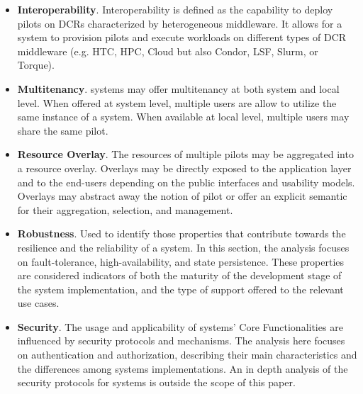 \documentclass{sig-alternate}
\begin{document}
\begin{itemize}
\item \textbf{Interoperability}. Interoperability is defined as the capability
  to deploy pilots on DCRs characterized by heterogeneous middleware. It allows
  for a \pilot system to provision pilots and execute workloads on different
  types of DCR middleware (e.g. HTC, HPC, Cloud but also Condor, LSF, Slurm, or
  Torque).

\item \textbf{Multitenancy}. \pilot systems may offer multitenancy at both
  system and local level. When offered at system level, multiple users are allow
  to utilize the same instance of a \pilot system. When available at local
  level, multiple users may share the same pilot.

\item \textbf{Resource Overlay}. The resources of multiple pilots may be
  aggregated into a resource overlay. Overlays may be directly exposed to the
  application layer and to the end-users depending on the public interfaces and
  usability models. Overlays may abstract away the notion of pilot or offer an
  explicit semantic for their aggregation, selection, and management.

\item \textbf{Robustness}. Used to identify those properties that contribute
  towards the resilience and the reliability of a \pilot system. In this
  section, the analysis focuses on fault-tolerance, high-availability, and state
  persistence. These properties are considered indicators of both the maturity
  of the development stage of the \pilot system implementation, and the type of
  support offered to the relevant use cases.


\item \textbf{Security}. The usage and applicability of \pilot systems' Core
Functionalities are influenced by security protocols and mechanisms. The
analysis here focuses on authentication and authorization, describing their main
characteristics and the differences among \pilot systems implementations. An in
depth analysis of the security protocols for \pilot systems is outside the scope
of this paper.


\end{itemize}
\end{document}
